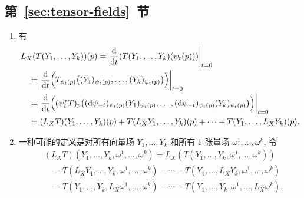 \subsection{\texorpdfstring{第~\ref{sec:tensor-fields}~节}{张量场}}\label{subsec:solutions-tensor-fields}

\begin{description}[font=\normalfont,leftmargin=2em,labelwidth=1.5em]
\begin{enumerate}[label=(\alph*),ref=\alph*,leftmargin=*]
\item 有
\begin{align*}
  &L_X(T(Y_1,\ldots,Y_k))(p)
  =\left.\frac{\mathrm{d}}{\mathrm{d}t}(T(Y_1,\ldots,Y_k)(\psi_t(p)))\right|_{t=0}\\
  &\quad=\left.\frac{\mathrm{d}}{\mathrm{d}t}
  \Bigl(T_{\psi_t(p)}\bigl((Y_1)_{\psi_t(p)},\ldots,(Y_k)_{\psi_t(p)}\bigr)\Bigr)\right|_{t=0}\\
  &\quad=\left.\frac{\mathrm{d}}{\mathrm{d}t}\Bigl((\psi_t^*T)_p\bigl(
  (\mathrm{d}\psi_{-t})_{\psi_t(p)}(Y_1)_{\psi_t(p)},\ldots,
  (\mathrm{d}\psi_{-t})_{\psi_t(p)}(Y_k)_{\psi_t(p)}\bigr)\Bigr)\right|_{t=0}\\
  &\quad=(L_XT)(Y_1,\ldots,Y_k)(p)
  +T(L_XY_1,\ldots,Y_k)(p)+\cdots+T(Y_1,\ldots,L_XY_k)(p).
\end{align*}
\item 一种可能的定义是对所有向量场 $Y_1,\ldots,Y_k$ 和所有 1-张量场 $\omega^1,\ldots,\omega^k$, 令
\begin{align*}
  &(L_XT)(Y_1,\ldots,Y_k,\omega^1,\ldots,\omega^k)
  =L_X(T(Y_1,\ldots,Y_k,\omega^1,\ldots,\omega^k))\\
  &\quad-T(L_XY_1,\ldots,Y_k,\omega^1,\ldots,\omega^k)
          -\cdots-T(Y_1,\ldots,L_XY_k,\omega^1,\ldots,\omega^k)\\
  &\quad-T(Y_1,\ldots,Y_k,L_X\omega^1,\ldots,\omega^k)
          -\cdots-T(Y_1,\ldots,Y_k,\omega^1,\ldots,L_X\omega^k).
\end{align*}
\end{enumerate}
\end{description}
